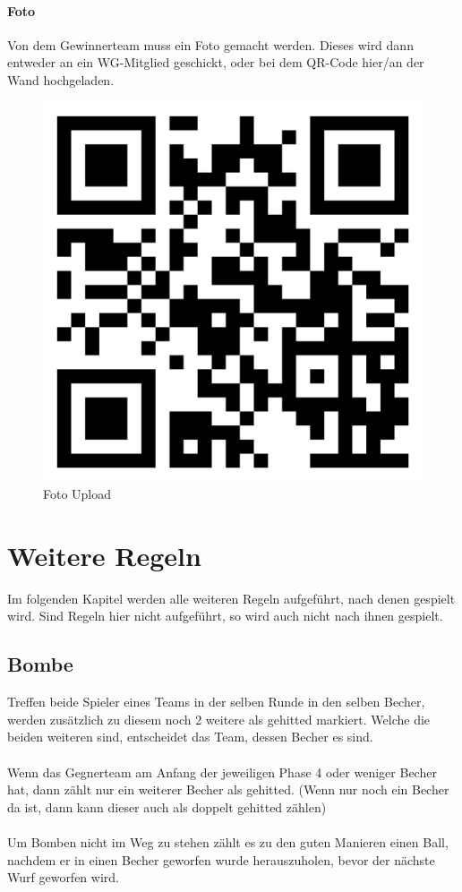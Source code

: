\documentclass[a5paper, 12pt]{book}
\begin{document}
\subsubsection{Foto}\label{foto}
Von dem Gewinnerteam muss ein Foto gemacht werden. Dieses wird dann entweder an ein WG-Mitglied geschickt, oder bei dem QR-Code hier/an der Wand hochgeladen.\\ 
\begin{figure}[htbt]
    \centering
    \includegraphics[scale = 0.1]{bilder}
    \caption{Foto Upload}
    \label{fig:fotoupload}
\end{figure}
\chapter{Weitere Regeln}\label{weitereregeln}
Im folgenden Kapitel werden alle weiteren Regeln aufgeführt, nach denen gespielt wird. Sind Regeln hier nicht aufgeführt, so wird auch nicht nach ihnen gespielt.
\section{Bombe}\label{bombe}
Treffen beide Spieler eines Teams in der selben Runde in den selben Becher, werden zusätzlich zu diesem noch 2 weitere als gehitted markiert. Welche die beiden weiteren sind, entscheidet das Team, dessen Becher es sind. \\\\
Wenn das Gegnerteam am Anfang der jeweiligen Phase 4 oder weniger Becher hat, dann zählt nur ein weiterer Becher als gehitted. (Wenn nur noch ein Becher da ist, dann kann dieser auch als doppelt gehitted zählen)\\\\
Um Bomben nicht im Weg zu stehen zählt es zu den guten Manieren einen Ball, nachdem er in einen Becher geworfen wurde herauszuholen, bevor der nächste Wurf geworfen wird.
\end{document}
